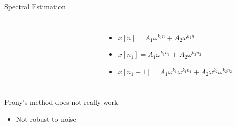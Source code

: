 \documentclass[10pt,xcolor=table]{beamer}
\begin{document}
\begin{frame}{Spectral Estimation}
	
        \begin{columns}		
		\begin{figure}
			\centering
			\scalebox{0.60}{}
		\end{figure}
		
		\begin{figure}
			\centering
			\scalebox{0.60}{}
		\end{figure}

        \begin{itemize}
        \item $x[n] = A_1 \omega^{k_1n} + A_2 \omega^{k_2 n}$
        \pause
        \item $x[n_1] = A_1 \omega^{k_1n_1} + A_2 \omega^{k_2 n_2}$
        \item $x[n_1+1] =  A_1 \omega^{k_1} \omega^{k_1n_1} + A_2 \omega^{k_2} \omega^{k_2 n_2}$
		\end{itemize}
	\end{columns}	
\pause
\begin{block}{Prony's method does not really work}
\begin{itemize}
  \item Not robust to noise
\end{itemize}
\end{block}
\end{frame}
\end{document}
